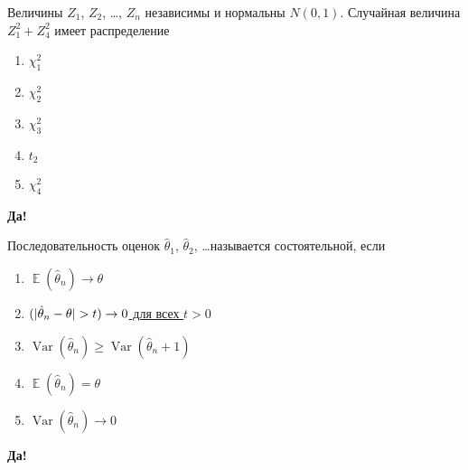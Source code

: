 \documentclass[t]{beamer}
\DeclareMathOperator{\Var}{Var}
\DeclareMathOperator{\E}{\mathbb{E}}
\let\P\relax
\DeclareMathOperator{\P}{\mathbb{P}}
\begin{document}
 \begin{frame} \label{38-Yes} 
\begin{block}{38} 

Величины $Z_1$, $Z_2$, \ldots, $Z_n$ независимы и нормальны $N(0,1)$. Случайная величина $Z_1^2+Z_4^2$ имеет распределение
 


 \end{block} 
\begin{enumerate} 
\item[] \hyperlink{38-No}{\beamergotobutton{} $\chi^2_1$}
\item[] \hyperlink{38-Yes}{\beamergotobutton{} $\chi^2_2$}
\item[] \hyperlink{38-No}{\beamergotobutton{} $\chi^2_3$}
\item[] \hyperlink{38-No}{\beamergotobutton{} $t_2$}
\item[] \hyperlink{38-No}{\beamergotobutton{} $\chi^2_4$}
\end{enumerate} 

 \textbf{Да!} 
 \hyperlink{39}{}\end{frame} 


 \begin{frame} \label{39-Yes} 
\begin{block}{39} 

Последовательность оценок $\hat{\theta}_1$, $\hat{\theta}_2$, \ldots называется состоятельной, если
 


 \end{block} 
\begin{enumerate} 
\item[] \hyperlink{39-No}{\beamergotobutton{} $\E(\hat\theta_n)\to \theta$}
\item[] \hyperlink{39-Yes}{\beamergotobutton{} $\P(|\hat\theta_n - \theta |>t)\to 0$ для всех $t>0$}
\item[] \hyperlink{39-No}{\beamergotobutton{} $\Var(\hat\theta_n)\geq \Var(\hat\theta_n+1)$}
\item[] \hyperlink{39-No}{\beamergotobutton{} $\E(\hat\theta_n)=\theta$}
\item[] \hyperlink{39-No}{\beamergotobutton{} $\Var(\hat\theta_n)\to 0$}
\end{enumerate} 

 \textbf{Да!} 
 \hyperlink{40}{}\end{frame} 
\end{document}

